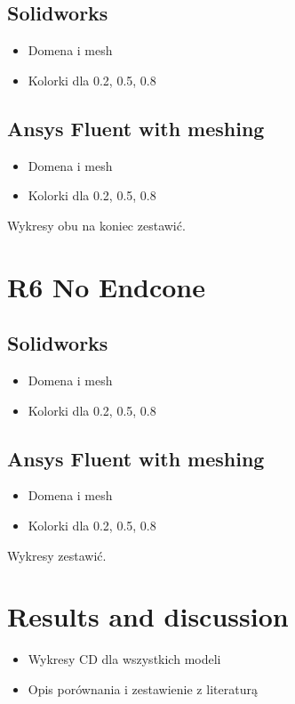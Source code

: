 \documentclass{article}
\begin{document}
\subsection{Solidworks}
\begin{itemize}
    \item Domena i mesh
    \item Kolorki dla 0.2, 0.5, 0.8
\end{itemize}
\subsection{Ansys Fluent with meshing}
\begin{itemize}
    \item Domena i mesh
    \item Kolorki dla 0.2, 0.5, 0.8
\end{itemize}
Wykresy obu na koniec zestawić.

\section{R6 No Endcone}
\subsection{Solidworks}
\begin{itemize}
    \item Domena i mesh
    \item Kolorki dla 0.2, 0.5, 0.8
\end{itemize}
\subsection{Ansys Fluent with meshing}
\begin{itemize}
    \item Domena i mesh
    \item Kolorki dla 0.2, 0.5, 0.8
\end{itemize}
Wykresy zestawić.

\section{Results and discussion}
\begin{itemize}
    \item Wykresy CD dla wszystkich modeli
    \item Opis porównania i zestawienie z literaturą
\end{itemize}
\end{document}
